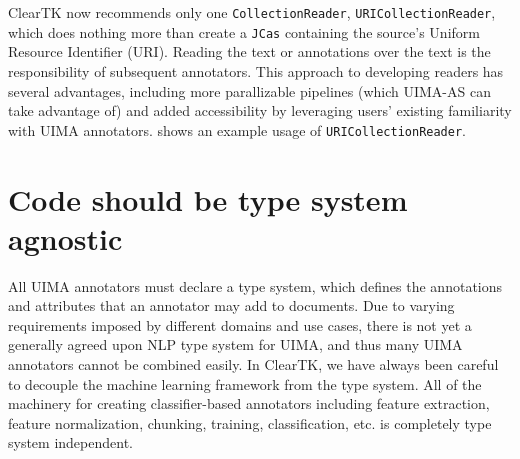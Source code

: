 \documentclass[10pt, a4paper]{article}
\newcommand{\code}[1]{\texttt{\small #1}}
\begin{document}
ClearTK now recommends only one \code{CollectionReader}, \code{URICollectionReader}, which does nothing more than create a \code{JCas} containing the source's Uniform Resource Identifier (URI).
Reading the text or annotations over the text is the responsibility of subsequent annotators.
This approach to developing readers has several advantages, including more parallizable pipelines (which UIMA-AS can take advantage of) and added accessibility by leveraging users' existing familiarity with UIMA annotators.
 shows an example usage of \code{URICollectionReader}.


\section{Code should be type system agnostic}
All UIMA annotators must declare a type system, which defines the annotations and attributes that an annotator may add to documents.
Due to varying requirements imposed by different domains and use cases, there is not yet a generally agreed upon NLP type system for UIMA, and thus many UIMA annotators cannot be combined easily.
In ClearTK, we have always been careful to decouple the machine learning framework from the type system. All of the machinery for creating classifier-based annotators including feature extraction, feature normalization, chunking, training, classification, etc. is completely type system independent.

\end{document}
